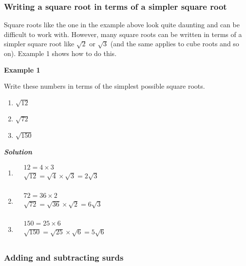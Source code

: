 \documentclass[
]{article}
\providecommand{\tightlist}{%
  \setlength{\itemsep}{0pt}\setlength{\parskip}{0pt}}
\begin{document}
\hypertarget{writing-a-square-root-in-terms-of-a-simpler-square-root}{%
\subsubsection{Writing a square root in terms of a simpler square
root}\label{writing-a-square-root-in-terms-of-a-simpler-square-root}}

Square roots like the one in the example above look quite daunting and
can be difficult to work with. However, many square roots can be written
in terms of a simpler square root like \(\sqrt{2}\) or \(\sqrt{3}\) (and
the same applies to cube roots and so on). Example 1 shows how to do
this.

\textbf{Example 1}

Write these numbers in terms of the simplest possible square roots.

\begin{enumerate}
\def\labelenumi{(\alph{enumi})}
\tightlist
\item
  \(\sqrt{12}\)\\
\item
  \(\sqrt{72}\)\\
\item
  \(\sqrt{150}\)
\end{enumerate}

\textbf{\emph{Solution}}

\begin{enumerate}
\def\labelenumi{(\alph{enumi})}
\item
  \(\begin{aligned} &12=4\times 3 \\ &\sqrt{12}=\sqrt{4} \times \sqrt{3}=2\sqrt{3} \\ \end{aligned}\)
\item
  \(\begin{aligned} &72=36\times 2 \\ &\sqrt{72}=\sqrt{36} \times \sqrt{2}=6\sqrt{3} \\ \end{aligned}\)
\item
  \(\begin{aligned} &150=25\times 6 \\ &\sqrt{150}=\sqrt{25} \times \sqrt{6}=5\sqrt{6} \\ \end{aligned}\)
\end{enumerate}

\hypertarget{adding-and-subtracting-surds}{%
\subsubsection{Adding and subtracting
surds}\label{adding-and-subtracting-surds}}
\end{document}
